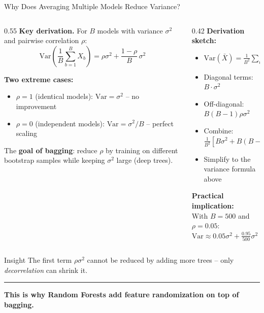 \documentclass[8pt,aspectratio=169]{beamer}
\newcommand{\bottomnote}[1]{%
\vfill
\vspace{-2mm}
\textcolor{mllavender2}{\rule{\textwidth}{0.4pt}}
\vspace{1mm}
\footnotesize
\textbf{#1}
}
\newenvironment{compactlist}{%
  \begin{itemize}%
    \setlength{\itemsep}{2pt}%
    \setlength{\parskip}{0pt}%
    \setlength{\parsep}{0pt}%
}{%
  \end{itemize}%
}
\newcommand{\highlight}[1]{\textcolor{mlorange}{\textbf{#1}}}
\begin{document}
\begin{frame}{Why Does Averaging Multiple Models Reduce Variance?}
\begin{columns}[T]
\begin{column}{0.55\textwidth}
\small
\textbf{Key derivation.} For $B$ models with variance $\sigma^2$ and pairwise correlation $\rho$:
\[
\text{Var}\!\left(\frac{1}{B}\sum_{b=1}^{B} X_b\right) = \rho\sigma^2 + \frac{1-\rho}{B}\,\sigma^2
\]

\vspace{0.3em}
\footnotesize
\textbf{Two extreme cases:}
\begin{compactlist}
\item $\rho = 1$ (identical models): $\text{Var} = \sigma^2$ -- no improvement
\item $\rho = 0$ (independent models): $\text{Var} = \sigma^2 / B$ -- perfect scaling
\end{compactlist}

\vspace{0.3em}
The \highlight{goal of bagging}: reduce $\rho$ by training on different bootstrap samples while keeping $\sigma^2$ large (deep trees).
\end{column}
\begin{column}{0.42\textwidth}
\footnotesize
\textbf{Derivation sketch:}
\begin{compactlist}
\item $\text{Var}(\bar{X}) = \frac{1}{B^2}\sum_{i,j}\text{Cov}(X_i,X_j)$
\item Diagonal terms: $B \cdot \sigma^2$
\item Off-diagonal: $B(B-1)\rho\sigma^2$
\item Combine: $\frac{1}{B^2}[B\sigma^2 + B(B-1)\rho\sigma^2]$
\item Simplify to the variance formula above
\end{compactlist}

\vspace{0.5em}
\textbf{Practical implication:}\\
With $B=500$ and $\rho=0.05$:\\
$\text{Var} \approx 0.05\sigma^2 + \frac{0.95}{500}\sigma^2 \approx 0.052\sigma^2$
\end{column}
\end{columns}

\begin{block}{Insight}
\scriptsize The first term $\rho\sigma^2$ cannot be reduced by adding more trees -- only \emph{decorrelation} can shrink it.
\end{block}
\bottomnote{This is why Random Forests add feature randomization on top of bagging.}
\end{frame}
\end{document}
